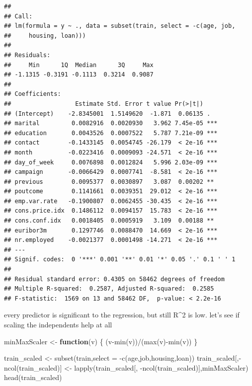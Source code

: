 \documentclass[
]{article}
\newenvironment{Shaded}{\begin{snugshade}}{\end{snugshade}}
\newcommand{\AttributeTok}[1]{\textcolor[rgb]{0.77,0.63,0.00}{#1}}
\newcommand{\ControlFlowTok}[1]{\textcolor[rgb]{0.13,0.29,0.53}{\textbf{#1}}}
\newcommand{\FunctionTok}[1]{\textcolor[rgb]{0.00,0.00,0.00}{#1}}
\newcommand{\NormalTok}[1]{#1}
\newcommand{\OtherTok}[1]{\textcolor[rgb]{0.56,0.35,0.01}{#1}}
\newcommand{\SpecialCharTok}[1]{\textcolor[rgb]{0.00,0.00,0.00}{#1}}
\begin{document}
\begin{verbatim}
## 
## Call:
## lm(formula = y ~ ., data = subset(train, select = -c(age, job, 
##     housing, loan)))
## 
## Residuals:
##     Min      1Q  Median      3Q     Max 
## -1.1315 -0.3191 -0.1113  0.3214  0.9087 
## 
## Coefficients:
##                  Estimate Std. Error t value Pr(>|t|)    
## (Intercept)    -2.8345001  1.5149620  -1.871  0.06135 .  
## marital         0.0082916  0.0020930   3.962 7.45e-05 ***
## education       0.0043526  0.0007522   5.787 7.21e-09 ***
## contact        -0.1433145  0.0054745 -26.179  < 2e-16 ***
## month          -0.0223416  0.0009093 -24.571  < 2e-16 ***
## day_of_week     0.0076898  0.0012824   5.996 2.03e-09 ***
## campaign       -0.0066429  0.0007741  -8.581  < 2e-16 ***
## previous        0.0095377  0.0030897   3.087  0.00202 ** 
## poutcome        0.1141661  0.0039351  29.012  < 2e-16 ***
## emp.var.rate   -0.1900807  0.0062455 -30.435  < 2e-16 ***
## cons.price.idx  0.1486112  0.0094157  15.783  < 2e-16 ***
## cons.conf.idx   0.0018405  0.0005919   3.109  0.00188 ** 
## euribor3m       0.1297746  0.0088470  14.669  < 2e-16 ***
## nr.employed    -0.0021377  0.0001498 -14.271  < 2e-16 ***
## ---
## Signif. codes:  0 '***' 0.001 '**' 0.01 '*' 0.05 '.' 0.1 ' ' 1
## 
## Residual standard error: 0.4305 on 58462 degrees of freedom
## Multiple R-squared:  0.2587, Adjusted R-squared:  0.2585 
## F-statistic:  1569 on 13 and 58462 DF,  p-value: < 2.2e-16
\end{verbatim}

every predictor is significant to the regression, but still R\^{}2 is
low. let's see if scaling the independents help at all

\begin{Shaded}
\begin{Highlighting}[]
\NormalTok{minMaxScaler }\OtherTok{\textless{}{-}} \ControlFlowTok{function}\NormalTok{(v) \{}
\NormalTok{  (v}\SpecialCharTok{{-}}\FunctionTok{min}\NormalTok{(v))}\SpecialCharTok{/}\NormalTok{(}\FunctionTok{max}\NormalTok{(v)}\SpecialCharTok{{-}}\FunctionTok{min}\NormalTok{(v))}
\NormalTok{\}}
\end{Highlighting}
\end{Shaded}

\begin{Shaded}
\begin{Highlighting}[]
\NormalTok{train\_scaled }\OtherTok{\textless{}{-}} \FunctionTok{subset}\NormalTok{(train,}\AttributeTok{select =} \SpecialCharTok{{-}}\FunctionTok{c}\NormalTok{(age,job,housing,loan))}
\NormalTok{train\_scaled[,}\SpecialCharTok{{-}}\FunctionTok{ncol}\NormalTok{(train\_scaled)] }\OtherTok{\textless{}{-}} \FunctionTok{lapply}\NormalTok{(train\_scaled[, }\SpecialCharTok{{-}}\FunctionTok{ncol}\NormalTok{(train\_scaled)],minMaxScaler)}
\FunctionTok{head}\NormalTok{(train\_scaled)}
\end{Highlighting}
\end{Shaded}
\end{document}
